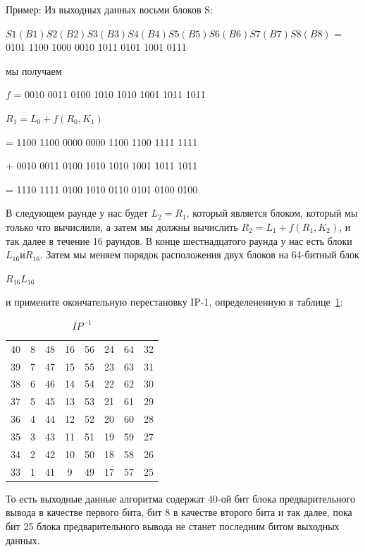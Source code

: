 Пример: Из выходных данных восьми блоков S:

$S1(B1)S2(B2)S3(B3)S4(B4)S5(B5)S6(B6)S7(B7)S8(B8)$ = 0101 1100 1000 0010 1011 0101 1001 0111

мы получаем

$f$ = 0010 0011 0100 1010 1010 1001 1011 1011

$R_1 = L_0 + f(R_0, K_1)$

= 1100 1100 0000 0000 1100 1100 1111 1111

+ 0010 0011 0100 1010 1010 1001 1011 1011

= 1110 1111 0100 1010 0110 0101 0100 0100

В следующем раунде у нас будет $L_2 = R_1$, который является блоком, который мы только что вычислили, а затем мы должны вычислить $R_2 = L_1 + f(R_1, K_2)$, и так далее в течение 16 раундов.
В конце шестнадцатого раунда у нас есть блоки $L_{16} и R_{16}$. 
Затем мы меняем порядок расположения двух блоков на 64-битный блок

$R_{16}L_{16}$

и примените окончательную перестановку IP-1, определененную в таблице~\ref{tbl:inv-ip}:

\begin{table}[ht!]
    \begin{center}
	\captionsetup{justification=raggedright,singlelinecheck=off}
	    \caption{\label{tbl:inv-ip} $IP^{-1}$}
        \begin{tabular}{ |c c c c c c c c|}
                40 & 8 & 48 & 16 & 56 & 24 & 64 & 32 \\
39 & 7 & 47 & 15 & 55 & 23 & 63 & 31 \\
38 & 6 & 46 & 14 & 54 & 22 & 62 & 30 \\
37 & 5 & 45 & 13 & 53 & 21 & 61 & 29 \\
36 & 4 & 44 & 12 & 52 & 20 & 60 & 28 \\
35 & 3 & 43 & 11 & 51 & 19 & 59 & 27 \\
34 & 2 & 42 & 10 & 50 & 18 & 58 & 26 \\
33 & 1 & 41 & 9 & 49 & 17 & 57 & 25
        \end{tabular}
    \end{center}
\end{table}

То есть выходные данные алгоритма содержат 40-ой бит блока предварительного вывода в качестве первого бита, бит 8 в качестве второго бита и так далее, пока бит 25 блока предварительного вывода не станет последним битом выходных данных.

